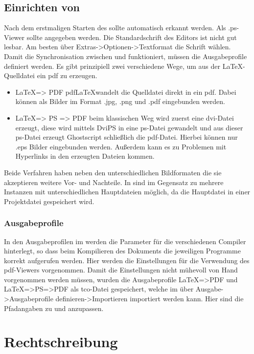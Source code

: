 \subsection{Einrichten von \Texniccenter}
Nach dem erstmaligen Starten des \Texniccenter{} sollte \Miktex{} automatisch erkannt werden.
Als .ps-Viewer sollte \Sumatra{} angegeben werden.
Die Standardschrift des Editors ist nicht gut lesbar.
Am besten über Extras->Optionen->Textformat die Schrift  wählen.
Damit die Synchronisation zwischen \Sumatra{} und \Texniccenter{} funktioniert, müssen die Ausgabeprofile definiert werden.
Es gibt prinzipiell zwei verschiedene Wege, um aus der \LaTeX-Quelldatei ein pdf zu erzeugen.
\begin{itemize}
	\item \LaTeX => PDF pdf\LaTeX wandelt die Quelldatei direkt in ein pdf.
	Dabei können als Bilder im Format .jpg, .png und .pdf eingebunden werden.
	\item \LaTeX => PS => PDF beim klassischen Weg wird zuerst eine dvi-Datei erzeugt, diese wird mittels DviPS in eine ps-Datei gewandelt und aus dieser ps-Datei erzeugt Ghostscript schließlich die pdf-Datei.
	Hierbei können nur .eps Bilder eingebunden werden.
	Außerdem kann es zu Problemen mit Hyperlinks in den erzeugten Dateien kommen.
\end{itemize}
Beide Verfahren haben neben den unterschiedlichen Bildformaten die sie akzeptieren weitere Vor- und Nachteile.
In \Texniccenter{} sind im Gegensatz zu \Texstudio{} mehrere Instanzen mit unterschiedlichen Hauptdateien möglich, da die Hauptdatei in einer Projektdatei gespeichert wird.

\subsubsection{Ausgabeprofile}
In den Ausgabeprofilen im \Texniccenter{} werden die Parameter für die verschiedenen Compiler hinterlegt, so dass beim Kompilieren des Dokuments die jeweiligen Programme korrekt aufgerufen werden.
Hier werden die Einstellungen für die Verwendung des pdf-Viewers vorgenommen.
Damit die Einstellungen nicht mühevoll von Hand vorgenommen werden müssen, wurden die Ausgabeprofile LaTeX=>PDF und LaTeX=>PS=>PDF als tco-Datei gespeichert, welche im \Texniccenter{} über Ausgabe->Ausgabeprofile definieren->Importieren importiert werden kann.
Hier sind \ggf die Pfadangaben zu \Miktex{} und \Sumatra{} anzupassen.


\section{Rechtschreibung}

